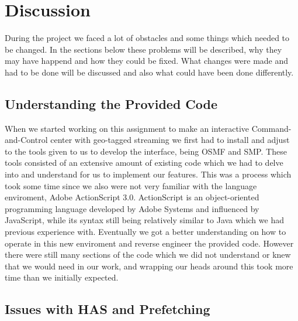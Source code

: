 \chapter{Discussion}
\label{cha:discussion}


During the project we faced a lot of obstacles and some things which needed to be changed. In the sections below these problems will be described, why they may have happend and how they could be fixed. What changes were made and had to be done will be discussed and also what could have been done differently.


\section{Understanding the Provided Code}
\label{sec:understandingcode}

When we started working on this assignment to make an interactive Command-and-Control center with geo-tagged streaming we first had to install and adjust to the tools given to us to develop the interface, being OSMF and SMP. These tools consisted of an extensive amount of existing code which we had to delve into and understand for us to implement our features.
This was a process which took some time since we also were not very familiar with the language enviroment, Adobe ActionScript 3.0. ActionScript is an object-oriented programming language developed by Adobe Systems and influenced by JavaScript, while its syntax still being relatively similar to Java which we had previous experience with. Eventually we got a better understanding on how to operate in this new enviroment and reverse engineer the provided code. However there were still many sections of the code which we did not understand or knew that we would need in our work, and wrapping our heads around this took more time than we initially expected. 

\section{Issues with HAS and Prefetching}
\label{sec:hasissues}

